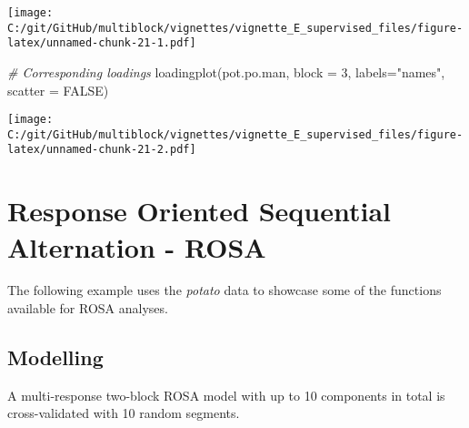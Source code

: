 \documentclass[
]{article}
\newenvironment{Shaded}{\begin{snugshade}}{\end{snugshade}}
\newcommand{\AttributeTok}[1]{\textcolor[rgb]{0.77,0.63,0.00}{#1}}
\newcommand{\CommentTok}[1]{\textcolor[rgb]{0.56,0.35,0.01}{\textit{#1}}}
\newcommand{\ConstantTok}[1]{\textcolor[rgb]{0.00,0.00,0.00}{#1}}
\newcommand{\DecValTok}[1]{\textcolor[rgb]{0.00,0.00,0.81}{#1}}
\newcommand{\FunctionTok}[1]{\textcolor[rgb]{0.00,0.00,0.00}{#1}}
\newcommand{\NormalTok}[1]{#1}
\newcommand{\StringTok}[1]{\textcolor[rgb]{0.31,0.60,0.02}{#1}}
\begin{document}
\texttt{[image: C:/git/GitHub/multiblock/vignettes/vignette\_E\_supervised\_files/figure-latex/unnamed-chunk-21-1.pdf]}

\begin{Shaded}
\begin{Highlighting}[]

\CommentTok{\# Corresponding loadings}
\FunctionTok{loadingplot}\NormalTok{(pot.po.man, }\AttributeTok{block =} \DecValTok{3}\NormalTok{, }\AttributeTok{labels=}\StringTok{"names"}\NormalTok{, }\AttributeTok{scatter =} \ConstantTok{FALSE}\NormalTok{)}
\end{Highlighting}
\end{Shaded}

\texttt{[image: C:/git/GitHub/multiblock/vignettes/vignette\_E\_supervised\_files/figure-latex/unnamed-chunk-21-2.pdf]}

\hypertarget{response-oriented-sequential-alternation---rosa}{%
\section{Response Oriented Sequential Alternation -
ROSA}\label{response-oriented-sequential-alternation---rosa}}

The following example uses the \emph{potato} data to showcase some of
the functions available for ROSA analyses.

\hypertarget{modelling-4}{%
\subsection{Modelling}\label{modelling-4}}

A multi-response two-block ROSA model with up to 10 components in total
is cross-validated with 10 random segments.
\end{document}
